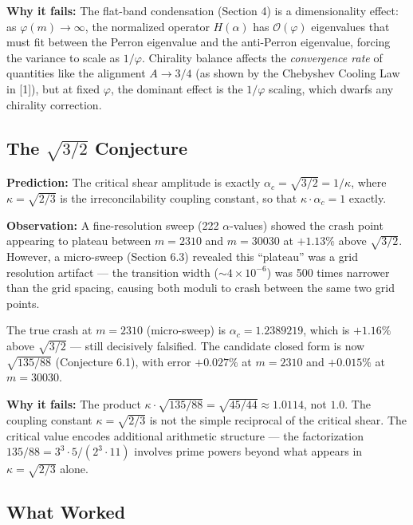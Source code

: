 \documentclass[11pt,letterpaper]{article}
\theoremstyle{definition}
\theoremstyle{remark}
\begin{document}
\textbf{Why it fails:} The flat-band condensation (Section 4) is a dimensionality effect: as $\varphi(m) \to \infty$, the normalized operator $H(\alpha)$ has $\mathcal{O}(\varphi)$ eigenvalues that must fit between the Perron eigenvalue and the anti-Perron eigenvalue, forcing the variance to scale as $1/\varphi$. Chirality balance affects the \emph{convergence rate} of quantities like the alignment $A \to 3/4$ (as shown by the Chebyshev Cooling Law in [1]), but at fixed $\varphi$, the dominant effect is the $1/\varphi$ scaling, which dwarfs any chirality correction.

\subsection{The $\sqrt{3/2}$ Conjecture}\label{the-sqrt32-conjecture}

\textbf{Prediction:} The critical shear amplitude is exactly $\alpha_c = \sqrt{3/2} = 1/\kappa$, where $\kappa = \sqrt{2/3}$ is the irreconcilability coupling constant, so that $\kappa \cdot \alpha_c = 1$ exactly.

\textbf{Observation:} A fine-resolution sweep (222 $\alpha$-values) showed the crash point appearing to plateau between $m = 2310$ and $m = 30030$ at $+1.13\%$ above $\sqrt{3/2}$. However, a micro-sweep (Section 6.3) revealed this ``plateau'' was a grid resolution artifact --- the transition width ($\sim 4 \times 10^{-6}$) was 500 times narrower than the grid spacing, causing both moduli to crash between the same two grid points.

The true crash at $m = 2310$ (micro-sweep) is $\alpha_c = 1.2389219$, which is $+1.16\%$ above $\sqrt{3/2}$ --- still decisively falsified. The candidate closed form is now $\sqrt{135/88}$ (Conjecture 6.1), with error $+0.027\%$ at $m = 2310$ and $+0.015\%$ at $m = 30030$.

\textbf{Why it fails:} The product $\kappa \cdot \sqrt{135/88} = \sqrt{45/44} \approx 1.0114$, not $1.0$. The coupling constant $\kappa = \sqrt{2/3}$ is not the simple reciprocal of the critical shear. The critical value encodes additional arithmetic structure --- the factorization $135/88 = 3^3 \cdot 5 / (2^3 \cdot 11)$ involves prime powers beyond what appears in $\kappa = \sqrt{2/3}$ alone.

\subsection{What Worked}\label{what-worked}
\end{document}
